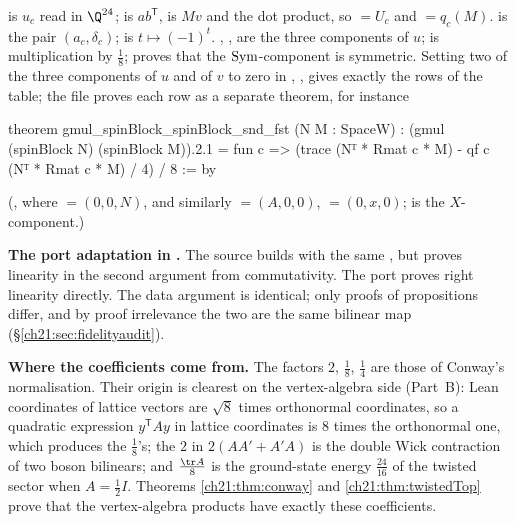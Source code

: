 \begin{dictionary}
 is $u_c$ read in $\Q^{24}$;  is $ab^{\mathsf T}$,  is $Mv$
and  the dot product, so  $=U_c$ and  $=q_c(M)$.   is the
pair $(a_c,\delta_c)$;  is $t\mapsto(-1)^t$.  , , 
are the three components of $u$;  is multiplication by $\frac18$; 
proves that the $\mathrm{Sym}$-component is symmetric.  Setting two of the three components of $u$ and of
$v$ to zero in , ,  gives exactly the rows of the table; the file
 proves each row as a separate theorem, for instance
\end{dictionary}
\begin{leancode}
theorem gmul_spinBlock_spinBlock_snd_fst (N M : SpaceW) :
    (gmul (spinBlock N) (spinBlock M)).2.1
      = fun c => (trace (Nᵀ * Rmat c * M) - qf c (Nᵀ * Rmat c * M) / 4) / 8 := by
\end{leancode}
(, where
 $=(0,0,N)$, and similarly  $=(A,0,0)$,  $=(0,x,0)$;
 is the $X$-component.)
\begin{dictionary}
\textbf{The port adaptation in .}  The source builds  with the same
, but proves linearity in the second argument from commutativity.  The
port proves right linearity directly.  The data argument  is identical; only proofs of
propositions differ, and by proof irrelevance the two  are the same bilinear map
(\S\ref{ch21:sec:fidelityaudit}).

\textbf{Where the coefficients come from.}  The factors $2$, $\frac18$, $\frac14$ are those of Conway's
normalisation.  Their origin is clearest on the vertex-algebra side (Part~B): Lean coordinates of lattice
vectors are $\sqrt8$ times orthonormal coordinates, so a quadratic expression $y^{\mathsf T}Ay$ in
lattice coordinates is $8$ times the orthonormal one, which produces the $\frac18$'s; the $2$ in
$2(AA'+A'A)$ is the double Wick contraction of two boson bilinears; and $\frac{\tr A}8$ is the
ground-state energy $\tfrac{24}{16}$ of the twisted sector when $A=\tfrac12I$.  Theorems
\ref{ch21:thm:conway} and \ref{ch21:thm:twistedTop} prove that the vertex-algebra products have exactly
these coefficients.
\end{dictionary}

